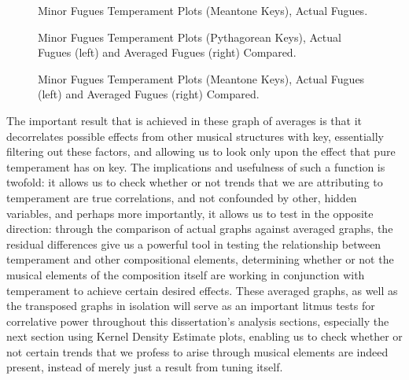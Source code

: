 \begin{figure}[H]
    \begin{center}
    \caption{Minor Fugues Temperament Plots (Meantone Keys), Actual Fugues. }
    \end{center}
\end{figure}
    



\begin{figure}[H]
    \begin{center}
    \caption[Minor Fugues Temperament Plots (Pythagorean Keys), Actual Fugues and Averaged Fugues Compared. ]{Minor Fugues Temperament Plots (Pythagorean Keys), Actual Fugues (left) and Averaged Fugues (right) Compared.}
    \end{center}
\end{figure}
    



\begin{figure}[H]
    \begin{center}
    \caption[Minor Fugues Temperament Plots (Meantone Keys), Actual Fugues and Averaged Fugues Compared. ]{Minor Fugues Temperament Plots (Meantone Keys), Actual Fugues (left) and Averaged Fugues (right) Compared.}
    \end{center}
\end{figure}
    
    The important result that is achieved in these graph of averages is that
it decorrelates possible effects from other musical structures with key,
essentially filtering out these factors, and allowing us to look only
upon the effect that pure temperament has on key. The implications and
usefulness of such a function is twofold: it allows us to check whether
or not trends that we are attributing to temperament are true
correlations, and not confounded by other, hidden variables, and perhaps
more importantly, it allows us to test in the opposite direction:
through the comparison of actual graphs against averaged graphs, the
residual differences give us a powerful tool in testing the relationship
between temperament and other compositional elements, determining
whether or not the musical elements of the composition itself are
working in conjunction with temperament to achieve certain desired
effects. These averaged graphs, as well as the transposed graphs in
isolation will serve as an important litmus tests for correlative power
throughout this dissertation's analysis sections, especially the next
section using Kernel Density Estimate plots, enabling us to check
whether or not certain trends that we profess to arise through musical
elements are indeed present, instead of merely just a result from tuning
itself.


